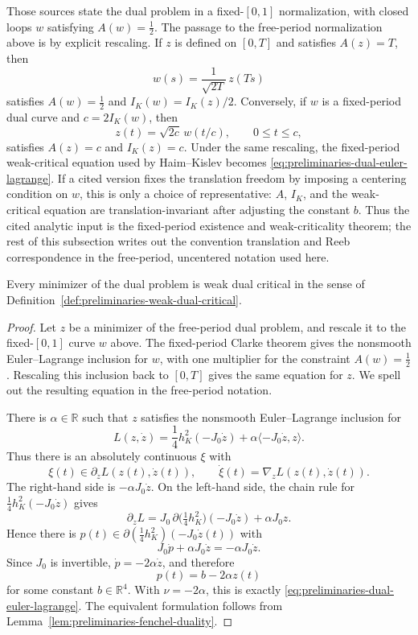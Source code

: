 Those sources state the dual problem in a fixed-\([0,1]\) normalization, with
closed loops \(w\) satisfying \(A(w)=\frac12\). The passage to the free-period
normalization above is by explicit rescaling. If \(z\) is defined on \([0,T]\)
and satisfies \(A(z)=T\), then
\[
  w(s)=\frac{1}{\sqrt{2T}}\,z(Ts)
\]
satisfies \(A(w)=\frac12\) and \(I_K(w)=I_K(z)/2\). Conversely, if \(w\) is a
fixed-period dual curve and \(c=2I_K(w)\), then
\[
  z(t)=\sqrt{2c}\,w(t/c),
  \qquad 0\leq t\leq c,
\]
satisfies \(A(z)=c\) and \(I_K(z)=c\). Under the same rescaling, the fixed-period
weak-critical equation used by Haim--Kislev becomes
\eqref{eq:preliminaries-dual-euler-lagrange}. If a cited version fixes the
translation freedom by imposing a centering condition on \(w\), this is only a
choice of representative: \(A\), \(I_K\), and the weak-critical equation are
translation-invariant after adjusting the constant \(b\). Thus the cited
analytic input is the fixed-period existence and weak-criticality theorem; the
rest of this subsection writes out the convention translation and Reeb
correspondence in the free-period, uncentered notation used here.

\begin{lemma}
\label{lem:preliminaries-dual-euler-lagrange}
Every minimizer of the dual problem is weak dual critical in the sense of
Definition~\ref{def:preliminaries-weak-dual-critical}.
\end{lemma}

\begin{proof}
Let \(z\) be a minimizer of the free-period dual problem, and rescale it to the
fixed-\([0,1]\) curve \(w\) above. The fixed-period Clarke theorem gives the
nonsmooth Euler--Lagrange inclusion for \(w\), with one multiplier for the
constraint \(A(w)=\frac12\). Rescaling this inclusion back to \([0,T]\) gives
the same equation for \(z\). We spell out the resulting equation in the
free-period notation.

There is \(\alpha\in\mathbb{R}\) such that \(z\) satisfies the nonsmooth
Euler--Lagrange inclusion for
\[
  L(z,\dot z)
  =\frac14h_K^2(-J_0\dot z)
    +\alpha\langle -J_0\dot z,z\rangle.
\]
Thus there is an absolutely continuous \(\xi\) with
\[
  \xi(t)\in\partial_{\dot z}L(z(t),\dot z(t)),
  \qquad
  \dot\xi(t)=\nabla_z L(z(t),\dot z(t)).
\]
The right-hand side is \(-\alpha J_0\dot z\). On the left-hand side, the chain
rule for \(\frac14h_K^2(-J_0\dot z)\) gives
\[
  \partial_{\dot z}L
  =J_0\,\partial\bigl(\tfrac14h_K^2\bigr)(-J_0\dot z)
    +\alpha J_0z.
\]
Hence there is
\(p(t)\in\partial(\frac14h_K^2)(-J_0\dot z(t))\) with
\[
  J_0\dot p+\alpha J_0\dot z=-\alpha J_0\dot z.
\]
Since \(J_0\) is invertible, \(\dot p=-2\alpha\dot z\), and therefore
\[
  p(t)=b-2\alpha z(t)
\]
for some constant \(b\in\mathbb{R}^4\). With \(\nu=-2\alpha\), this is exactly
\eqref{eq:preliminaries-dual-euler-lagrange}. The equivalent formulation
follows from Lemma~\ref{lem:preliminaries-fenchel-duality}.
\end{proof}

